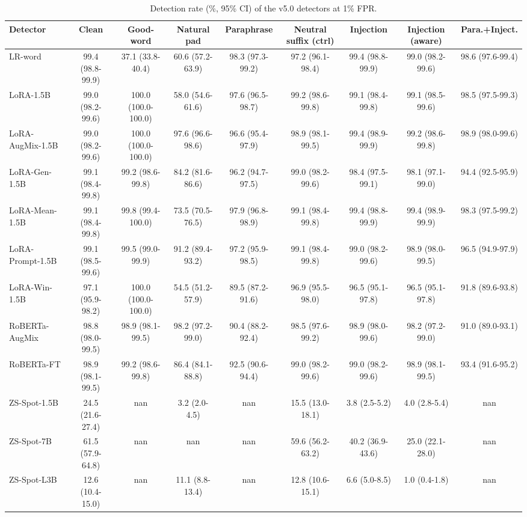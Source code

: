\begin{table}[t]
\centering
\caption{Detection rate (\%, 95\% CI) of the v5.0 detectors at 1\% FPR.}
\label{tab:v5matrix}
\footnotesize
\begin{tabular}{lcccccccc}
\toprule
\textbf{Detector} & \textbf{Clean} & \textbf{Good-word} & \textbf{Natural pad} & \textbf{Paraphrase} & \textbf{Neutral suffix (ctrl)} & \textbf{Injection} & \textbf{Injection (aware)} & \textbf{Para.+Inject.} \\
\midrule
LR-word & 99.4 (98.8-99.9) & 37.1 (33.8-40.4) & 60.6 (57.2-63.9) & 98.3 (97.3-99.2) & 97.2 (96.1-98.4) & 99.4 (98.8-99.9) & 99.0 (98.2-99.6) & 98.6 (97.6-99.4) \\
LoRA-1.5B & 99.0 (98.2-99.6) & 100.0 (100.0-100.0) & 58.0 (54.6-61.6) & 97.6 (96.5-98.7) & 99.2 (98.6-99.8) & 99.1 (98.4-99.8) & 99.1 (98.5-99.6) & 98.5 (97.5-99.3) \\
LoRA-AugMix-1.5B & 99.0 (98.2-99.6) & 100.0 (100.0-100.0) & 97.6 (96.6-98.6) & 96.6 (95.4-97.9) & 98.9 (98.1-99.5) & 99.4 (98.9-99.9) & 99.2 (98.6-99.8) & 98.9 (98.0-99.6) \\
LoRA-Gen-1.5B & 99.1 (98.4-99.8) & 99.2 (98.6-99.8) & 84.2 (81.6-86.6) & 96.2 (94.7-97.5) & 99.0 (98.2-99.6) & 98.4 (97.5-99.1) & 98.1 (97.1-99.0) & 94.4 (92.5-95.9) \\
LoRA-Mean-1.5B & 99.1 (98.4-99.8) & 99.8 (99.4-100.0) & 73.5 (70.5-76.5) & 97.9 (96.8-98.9) & 99.1 (98.4-99.8) & 99.4 (98.8-99.9) & 99.4 (98.9-99.9) & 98.3 (97.5-99.2) \\
LoRA-Prompt-1.5B & 99.1 (98.5-99.6) & 99.5 (99.0-99.9) & 91.2 (89.4-93.2) & 97.2 (95.9-98.5) & 99.1 (98.4-99.8) & 99.0 (98.2-99.6) & 98.9 (98.0-99.5) & 96.5 (94.9-97.9) \\
LoRA-Win-1.5B & 97.1 (95.9-98.2) & 100.0 (100.0-100.0) & 54.5 (51.2-57.9) & 89.5 (87.2-91.6) & 96.9 (95.5-98.0) & 96.5 (95.1-97.8) & 96.5 (95.1-97.8) & 91.8 (89.6-93.8) \\
RoBERTa-AugMix & 98.8 (98.0-99.5) & 98.9 (98.1-99.5) & 98.2 (97.2-99.0) & 90.4 (88.2-92.4) & 98.5 (97.6-99.2) & 98.9 (98.0-99.6) & 98.2 (97.2-99.0) & 91.0 (89.0-93.1) \\
RoBERTa-FT & 98.9 (98.1-99.5) & 99.2 (98.6-99.8) & 86.4 (84.1-88.8) & 92.5 (90.6-94.4) & 99.0 (98.2-99.6) & 99.0 (98.2-99.6) & 98.9 (98.1-99.5) & 93.4 (91.6-95.2) \\
ZS-Spot-1.5B & 24.5 (21.6-27.4) & nan & 3.2 (2.0-4.5) & nan & 15.5 (13.0-18.1) & 3.8 (2.5-5.2) & 4.0 (2.8-5.4) & nan \\
ZS-Spot-7B & 61.5 (57.9-64.8) & nan & nan & nan & 59.6 (56.2-63.2) & 40.2 (36.9-43.6) & 25.0 (22.1-28.0) & nan \\
ZS-Spot-L3B & 12.6 (10.4-15.0) & nan & 11.1 (8.8-13.4) & nan & 12.8 (10.6-15.1) & 6.6 (5.0-8.5) & 1.0 (0.4-1.8) & nan \\
\bottomrule
\end{tabular}
\end{table}
